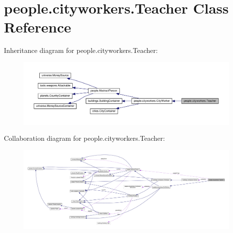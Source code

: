 \hypertarget{classpeople_1_1cityworkers_1_1_teacher}{}\section{people.\+cityworkers.\+Teacher Class Reference}
\label{classpeople_1_1cityworkers_1_1_teacher}


Inheritance diagram for people.\+cityworkers.\+Teacher\+:\nopagebreak
\begin{figure}[H]
\begin{center}
\leavevmode
\includegraphics[width=350pt]{classpeople_1_1cityworkers_1_1_teacher__inherit__graph}
\end{center}
\end{figure}


Collaboration diagram for people.\+cityworkers.\+Teacher\+:\nopagebreak
\begin{figure}[H]
\begin{center}
\leavevmode
\includegraphics[width=350pt]{classpeople_1_1cityworkers_1_1_teacher__coll__graph}
\end{center}
\end{figure}
